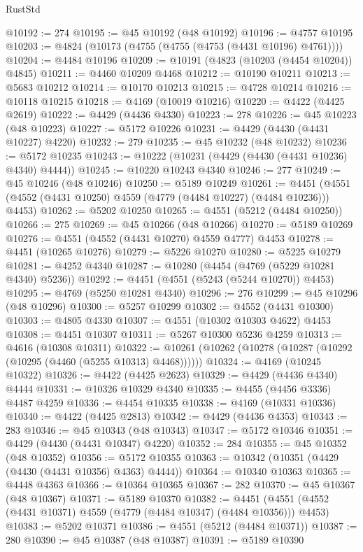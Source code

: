 \begin{lexlean}{RustStd}
\begin{coremodule}
@10192 := 274
@10195 := @45 @10192 (@48 @10192)
@10196 := @4757 @10195
@10203 := @4824 (@10173 (@4755 (@4755 (@4753 (@4431 @10196) @4761))))
@10204 := @4484 @10196
@10209 := @10191 (@4823 (@10203 (@4454 @10204)) @4845)
@10211 := @4460 @10209 @4468
@10212 := @10190 @10211
@10213 := @5683 @10212
@10214 := @10170 @10213
@10215 := @4728 @10214
@10216 := @10118 @10215
@10218 := @4169 (@10019 @10216)
@10220 := @4422 (@4425 @2619)
@10222 := @4429 (@4436 @4330)
@10223 := 278
@10226 := @45 @10223 (@48 @10223)
@10227 := @5172 @10226
@10231 := @4429 (@4430 (@4431 @10227) @4220)
@10232 := 279
@10235 := @45 @10232 (@48 @10232)
@10236 := @5172 @10235
@10243 := @10222 (@10231 (@4429 (@4430 (@4431 @10236) @4340) @4444))
@10245 := @10220 @10243 @4340
@10246 := 277
@10249 := @45 @10246 (@48 @10246)
@10250 := @5189 @10249
@10261 := @4451 (@4551 (@4552 (@4431 @10250) @4559 (@4779 (@4484 @10227) (@4484 @10236))) @4453)
@10262 := @5202 @10250
@10265 := @4551 (@5212 (@4484 @10250))
@10266 := 275
@10269 := @45 @10266 (@48 @10266)
@10270 := @5189 @10269
@10276 := @4551 (@4552 (@4431 @10270) @4559 @4777) @4453
@10278 := @4451 (@10265 @10276)
@10279 := @5226 @10270
@10280 := @5225 @10279
@10281 := @4252 @4340
@10287 := @10280 (@4454 (@4769 (@5229 @10281 @4340) @5236))
@10292 := @4451 (@4551 (@5243 (@5244 @10270)) @4453)
@10295 := @4769 (@5250 @10281 @4340)
@10296 := 276
@10299 := @45 @10296 (@48 @10296)
@10300 := @5257 @10299
@10302 := @4552 (@4431 @10300)
@10303 := @4805 @4330
@10307 := @4551 (@10302 @10303 @4622) @4453
@10308 := @4451 @10307
@10311 := @5267 @10300 @5236 @4259
@10313 := @4616 (@10308 @10311)
@10322 := @10261 (@10262 (@10278 (@10287 (@10292 (@10295 (@4460 (@5255 @10313) @4468))))))
@10324 := @4169 (@10245 @10322)
@10326 := @4422 (@4425 @2623)
@10329 := @4429 (@4436 @4340) @4444
@10331 := @10326 @10329 @4340
@10335 := @4455 (@4456 @3336) @4487 @4259
@10336 := @4454 @10335
@10338 := @4169 (@10331 @10336)
@10340 := @4422 (@4425 @2813)
@10342 := @4429 (@4436 @4353)
@10343 := 283
@10346 := @45 @10343 (@48 @10343)
@10347 := @5172 @10346
@10351 := @4429 (@4430 (@4431 @10347) @4220)
@10352 := 284
@10355 := @45 @10352 (@48 @10352)
@10356 := @5172 @10355
@10363 := @10342 (@10351 (@4429 (@4430 (@4431 @10356) @4363) @4444))
@10364 := @10340 @10363
@10365 := @4448 @4363
@10366 := @10364 @10365
@10367 := 282
@10370 := @45 @10367 (@48 @10367)
@10371 := @5189 @10370
@10382 := @4451 (@4551 (@4552 (@4431 @10371) @4559 (@4779 (@4484 @10347) (@4484 @10356))) @4453)
@10383 := @5202 @10371
@10386 := @4551 (@5212 (@4484 @10371))
@10387 := 280
@10390 := @45 @10387 (@48 @10387)
@10391 := @5189 @10390

\end{coremodule}
\end{lexlean}
